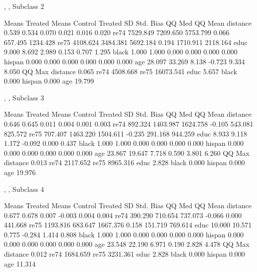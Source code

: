 \documentclass[oneside,letterpaper,titlepage]{article}
\begin{document}
\begin{Schunk}
\begin{Soutput}
, , Subclass 2

         Means Treated Means Control Treated SD Std. Bias    QQ Med   QQ Mean
distance         0.539         0.534      0.070     0.021     0.016     0.020
re74          7529.849      7209.650   5753.799     0.066   657.495  1234.428
re75          4108.624      3484.381   5692.184     0.194  1710.911  2118.164
educ             9.000         8.692      2.989     0.153     0.707     1.295
black            1.000         1.000      0.000     0.000     0.000     0.000
hispan           0.000         0.000      0.000     0.000     0.000     0.000
age             28.097        33.269      8.138    -0.723     9.334     8.050
            QQ Max
distance     0.065
re74      4508.668
re75     16073.541
educ         5.657
black        0.000
hispan       0.000
age         19.799

, , Subclass 3

         Means Treated Means Control Treated SD Std. Bias    QQ Med   QQ Mean
distance         0.646         0.645      0.011     0.004     0.001     0.003
re74           892.324      1403.987   1624.758    -0.105   543.081   825.572
re75           707.407      1463.220   1504.611    -0.235   291.168   944.259
educ             8.933         9.118      1.172    -0.092     0.000     0.437
black            1.000         1.000      0.000     0.000     0.000     0.000
hispan           0.000         0.000      0.000     0.000     0.000     0.000
age             23.867        19.647      7.718     0.590     3.801     6.260
            QQ Max
distance     0.013
re74      2117.652
re75      8965.316
educ         2.828
black        0.000
hispan       0.000
age         19.976

, , Subclass 4

         Means Treated Means Control Treated SD Std. Bias    QQ Med   QQ Mean
distance         0.677         0.678      0.007    -0.003     0.004     0.004
re74           390.290       710.654    737.073    -0.066     0.000   441.668
re75          1193.816       683.647   1667.376     0.158   151.719   769.614
educ            10.000        10.571      0.775    -0.284     1.414     0.808
black            1.000         1.000      0.000     0.000     0.000     0.000
hispan           0.000         0.000      0.000     0.000     0.000     0.000
age             23.548        22.190      6.971     0.190     2.828     4.478
            QQ Max
distance     0.012
re74      1684.659
re75      3231.361
educ         2.828
black        0.000
hispan       0.000
age         11.314


\end{Soutput}
\end{Schunk}
\end{document}
